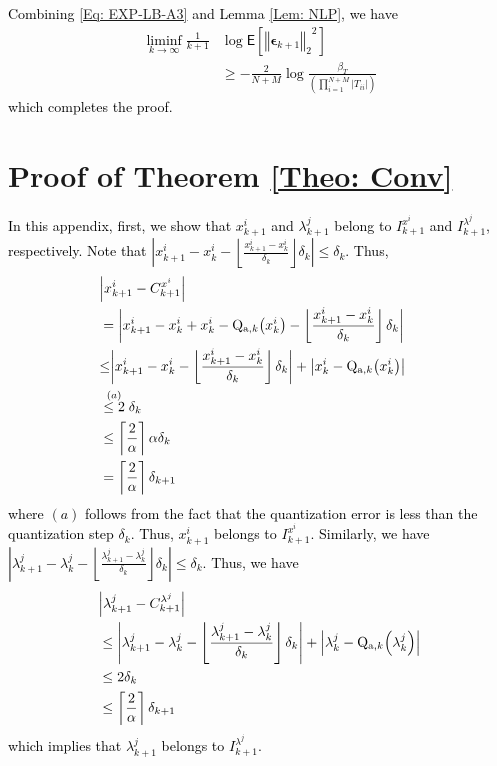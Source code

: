 \documentclass[10pt,twocolumn,twoside]{IEEEtran}
\begin{document}
\textcolor{black}{Combining \eqref{Eq: EXP-LB-A3} and Lemma \ref{Lem: NLP}, we have 
\begin{align}
\liminf_{k\rightarrow\infty}\frac{1}{k+1}&\log{{\ensuremath{\mathsf{E}\left[{{\left\Vert{{\ensuremath{\boldsymbol{{\epsilon}}}}_{k+1}}\right\Vert_{{2}}}^2} \right]}}}\nonumber\\
&\geq -\frac{2}{N+M}\log{\frac{ \beta_T}{{\left({\prod_{i=1}^{N+M}{\left|{T_{ii}}\right|}}\right)}}} 
\end{align}
which completes the proof.
}
\section{Proof of Theorem \ref{Theo: Conv}}\label{App:Conv}
\textcolor{black}{In this appendix, first, we show that $x^i_{k+1}$ and $\lambda^j_{k+1}$ belong to $I^{x^i}_{k+1}$ and $I^{\lambda^j}_{k+1}$, respectively. Note that ${\left|{x^i_{k+1}-x^i_k-\left\lfloor \frac{x^i_{k+1}-x^i_k}{\delta_k}\right\rfloor\delta_k}\right|}\leq \delta_k$. Thus, 
\begin{align}
&{\left|{x^i_{k+1}-C^{x^i}_{k+1}}\right|}&\nonumber\\
&= {\left|{x^i_{k+1}-x^i_{k}+x^i_{k}-{\rm Q}_{{\rm a},k}{\left({x^i_k}\right)}-\left\lfloor \frac{x^i_{k+1}-x^i_k}{\delta_k}\right\rfloor\delta_k}\right|}\nonumber\\
&{\leq} {\left|{x^i_{k+1}-x^i_{k}-\left\lfloor \frac{x^i_{k+1}-x^i_k}{\delta_k}\right\rfloor\delta_k}\right|}+{\left|{x^i_{k}-{\rm Q}_{{\rm a},k}{\left({x^i_k}\right)}}\right|}\nonumber\\
&\stackrel{{\left({a}\right)}}{\leq2}\delta_k\nonumber\\
&\leq \left\lceil \frac{2}{\alpha}\right\rceil\alpha\delta_k\nonumber\\
&= \left\lceil \frac{2}{\alpha}\right\rceil\delta_{k+1}
\end{align}
where $(a)$ follows from the fact that the quantization error is less than the quantization step $\delta_k$. Thus, $x^i_{k+1}$ belongs to $I^{x^i}_{k+1}$. Similarly, we have ${\left|{\lambda^j_{k+1}-\lambda^j_k-\left\lfloor \frac{\lambda^j_{k+1}-\lambda^j_{k}}{\delta_k}\right\rfloor\delta_k}\right|}\leq \delta_k$. Thus, we have 
\begin{align}
&{\left|{\lambda^j_{k+1}-C^{\lambda^j}_{k+1}}\right|}\nonumber\\
&\leq {\left|{\lambda^j_{k+1}-\lambda^j_k-\left\lfloor \frac{\lambda^j_{k+1}-\lambda^j_{k}}{\delta_k}\right\rfloor\delta_k}\right|}+{\left|{\lambda^j_k-{\rm Q}_{{\rm a},k}{\left({\lambda^j_k}\right)}}\right|}\nonumber\\
&\leq 2\delta_k\nonumber\\
&\leq \left\lceil \frac{2}{\alpha}\right\rceil\delta_{k+1}
\end{align}
which implies that $\lambda^j_{k+1}$ belongs to $I^{\lambda^j}_{k+1}$.}
\end{document}

